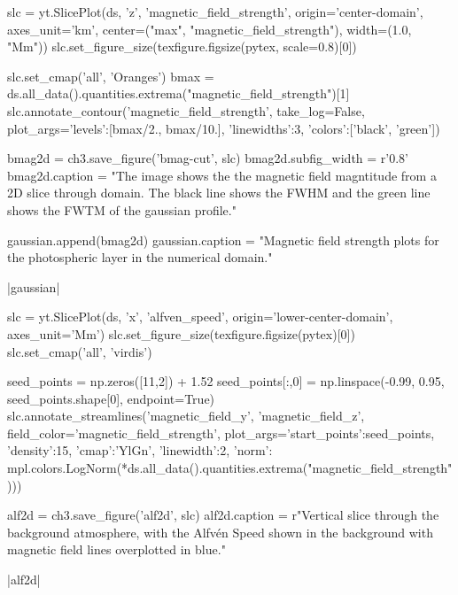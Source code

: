 \begin{pycode}[chapter3]
slc = yt.SlicePlot(ds, 'z', 'magnetic_field_strength', origin='center-domain',
axes_unit='km', center=("max", "magnetic_field_strength"), width=(1.0, "Mm"))
slc.set_figure_size(texfigure.figsize(pytex, scale=0.8)[0])

slc.set_cmap('all', 'Oranges')
bmax = ds.all_data().quantities.extrema("magnetic_field_strength")[1]
slc.annotate_contour('magnetic_field_strength', take_log=False,
plot_args={'levels':[bmax/2., bmax/10.],
'linewidths':3,
'colors':['black', 'green']})

bmag2d = ch3.save_figure('bmag-cut', slc)
bmag2d.subfig_width = r'0.8\columnwidth'
bmag2d.caption = "The image shows the the magnetic field magntitude from a 2D slice through domain. The black line shows the FWHM and the green line shows the FWTM of the gaussian profile."

gaussian.append(bmag2d)
gaussian.caption = "Magnetic field strength plots for the photospheric layer in the numerical domain."

\end{pycode}


\py[chapter3]|gaussian|

\begin{pycode}[chapter3]
slc = yt.SlicePlot(ds, 'x', 'alfven_speed', origin='lower-center-domain', axes_unit='Mm')
slc.set_figure_size(texfigure.figsize(pytex)[0])
slc.set_cmap('all', 'virdis')

seed_points = np.zeros([11,2]) + 1.52
seed_points[:,0] = np.linspace(-0.99, 0.95, seed_points.shape[0], endpoint=True)
slc.annotate_streamlines('magnetic_field_y', 'magnetic_field_z', field_color='magnetic_field_strength',
plot_args={'start_points':seed_points, 'density':15, 'cmap':'YlGn', 'linewidth':2,
'norm': mpl.colors.LogNorm(*ds.all_data().quantities.extrema("magnetic_field_strength"))})

alf2d = ch3.save_figure('alf2d', slc)
alf2d.caption = r"Vertical slice through the background atmosphere, with the Alfv\'en Speed shown in the background with magnetic field lines overplotted in blue."
\end{pycode}

\py[chapter3]|alf2d|

